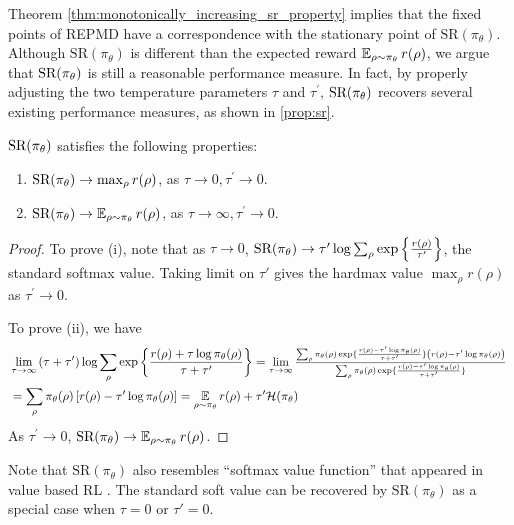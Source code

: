 \documentclass{article} %
\begin{document}
Theorem \ref{thm:monotonically_increasing_sr_property} implies that the fixed points of REPMD have a correspondence with the stationary point of $\text{SR}(\pi_\theta)$. 
Although $\text{SR}(\pi_\theta)$ is different than the expected reward $\operatorname*{\mathbb{E}}_{\rho \sim \pi_\theta}{r(\rho)}$,  we argue that $\text{SR}(\pi_\theta)$ is still a reasonable performance measure. In fact, by properly adjusting the two temperature parameters $\tau$ and $\tau^{\prime}$, $\text{SR}(\pi_\theta)$ recovers several existing performance measures, as shown in \cref{prop:sr}.
\begin{prop}
\label{prop:sr}
$\text{SR}(\pi_\theta)$ satisfies the following properties:
\begin{enumerate}[label=(\roman*)]
	\item  $\text{SR}(\pi_\theta) \to \max_{\rho}{r(\rho)}$, as $\tau \to 0, \tau^{\prime} \to 0$.
	\item $\text{SR}(\pi_\theta) \to \operatorname*{\mathbb{E}}_{\rho \sim \pi_\theta}{r(\rho)}$, as $\tau \to \infty, \tau^{\prime} \to 0$. 
\end{enumerate}	
\end{prop}
\begin{proof}
To prove (i), note that as $\tau \to 0$, $\text{SR}(\pi_\theta) \to \tau^{\prime} \log{ \sum_{\rho}{ \exp\left\{ \frac{r(\rho) }{ \tau^{\prime} } \right\} }}$, the standard softmax value. Taking limit on $\tau'$ gives the hardmax value $\max_{\rho}{r(\rho)}$ as $\tau^{\prime} \to 0$.
	
To prove (ii), we have 
\begin{align*}
	&\lim\limits_{\tau \to \infty}{ (\tau + \tau^{\prime})\log{ \sum_{\rho}{ \exp\left\{ \frac{r(\rho) + \tau \log{\pi_\theta(\rho)} }{\tau + \tau^{\prime}} \right\} }} } = {\scalebox{.95} {$\lim\limits_{\tau \to \infty}{ \frac{ \sum_{\rho}{ \pi_\theta(\rho) \exp\{ \frac{r(\rho) - \tau^{\prime} \log{\pi_\theta(\rho)} }{\tau + \tau^{\prime}} \} \left( r(\rho) - \tau^{\prime}\log{\pi_\theta(\rho)} \right) } }{  \sum_{\rho}{ \pi_\theta(\rho) \exp\{ \frac{r(\rho) - \tau^{\prime} \log{\pi_\theta(\rho)} }{\tau + \tau^{\prime}} \} } } }$ } }\\
	&= \sum_{\rho}{ \pi_\theta(\rho) \left[ r(\rho) - \tau^{\prime}\log{\pi_\theta(\rho)} \right] } = \ep_{\rho \sim \pi_\theta}{r(\rho)} + \tau^{\prime} \mathcal{H}(\pi_\theta)
\end{align*}
As $\tau^{\prime} \to 0$, $\text{SR}(\pi_\theta) \to \operatorname*{\mathbb{E}}_{\rho \sim \pi_\theta}{r(\rho)}$.
\end{proof}

Note that $\text{SR}(\pi_\theta)$ also resembles ``softmax value function'' that appeared in value based RL \citep{nachum2017bridging,haarnoja2018soft,ding2017cold}. The standard soft value can be recovered by $\text{SR}(\pi_\theta)$ as a special case when $\tau = 0$ or $\tau'=0$. 
\end{document}
